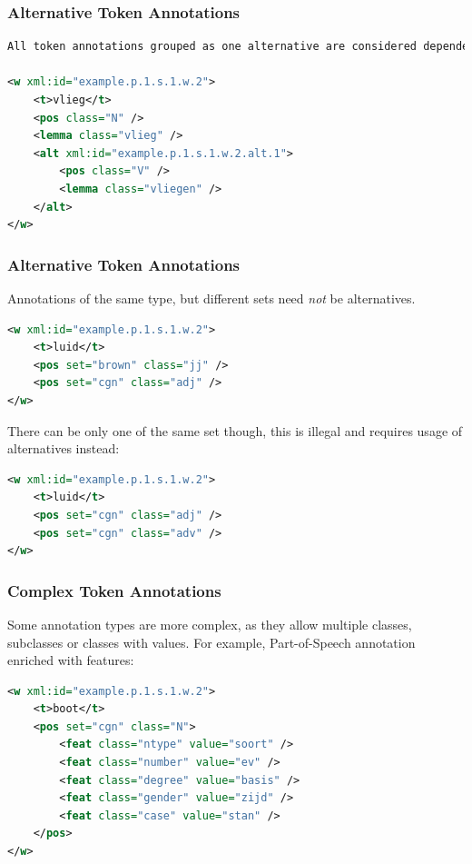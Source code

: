 \documentclass[compress]{beamer}
\begin{document}
\begin{frame}[fragile]
\frametitle{Alternative Token Annotations}

\begin{lstlisting}[language=xml]
All token annotations grouped as one alternative are considered dependent. Multiple alternatives are always independent:

<w xml:id="example.p.1.s.1.w.2">
    <t>vlieg</t>
    <pos class="N" />
    <lemma class="vlieg" />
    <alt xml:id="example.p.1.s.1.w.2.alt.1">
        <pos class="V" />
        <lemma class="vliegen" />
    </alt>
</w>                         
\end{lstlisting}        

\end{frame}


\begin{frame}[fragile]
\frametitle{Alternative Token Annotations}

Annotations of the same type, but different sets need \emph{not} be alternatives.

\begin{lstlisting}[language=xml]
<w xml:id="example.p.1.s.1.w.2">
    <t>luid</t>
    <pos set="brown" class="jj" />
    <pos set="cgn" class="adj" />
</w>                         
\end{lstlisting}        

There can be only one of the same set though, this is illegal and requires usage of alternatives instead:

\begin{lstlisting}[language=xml]
<w xml:id="example.p.1.s.1.w.2">
    <t>luid</t>
    <pos set="cgn" class="adj" />
    <pos set="cgn" class="adv" />
</w>                         
\end{lstlisting}   

\end{frame}
\begin{frame}[fragile]
\frametitle{Complex Token Annotations}

Some annotation types are more complex, as they allow multiple classes, subclasses or classes with values. For example, Part-of-Speech annotation enriched with features:

\begin{lstlisting}[language=xml]
<w xml:id="example.p.1.s.1.w.2">
    <t>boot</t>
    <pos set="cgn" class="N">
        <feat class="ntype" value="soort" />
        <feat class="number" value="ev" />
        <feat class="degree" value="basis" />
        <feat class="gender" value="zijd" />
        <feat class="case" value="stan" />
    </pos>
</w>
\end{lstlisting}    

\end{frame}
\end{document}
